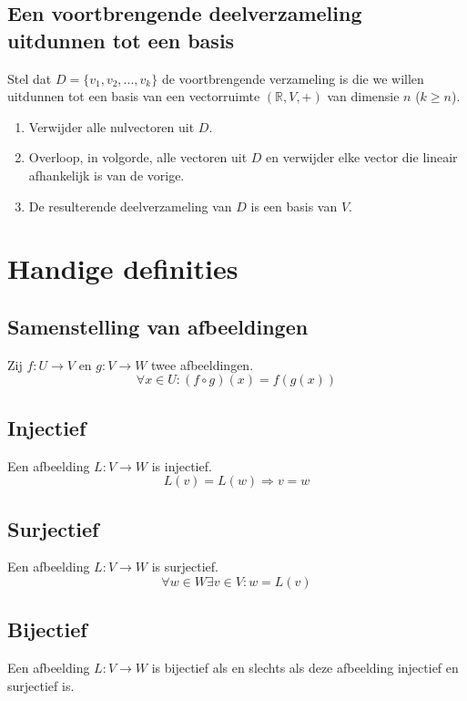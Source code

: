 \documentclass[lineaire_algebra_oplossingen.tex]{subfiles}
\begin{document}
\subsection{Een voortbrengende deelverzameling uitdunnen tot een basis}
Stel dat $D = \{v_1,v_2,...,v_k\}$ de voortbrengende verzameling is die we willen uitdunnen tot een basis van een vectorruimte $(\mathbb{R},V,+)$ van dimensie $n$ ($k\ge n$).
\begin{enumerate}
\item Verwijder alle nulvectoren uit $D$.
\item Overloop, in volgorde, alle vectoren uit $D$ en verwijder elke vector die lineair afhankelijk is van de vorige.
\item De resulterende deelverzameling van $D$ is een basis van $V$.
\end{enumerate}

\section{Handige definities}
\subsection{Samenstelling van afbeeldingen}
\label{samenstelling_van_afbeeldingen}
Zij $f: U \rightarrow V$ en $g: V\rightarrow W$ twee afbeeldingen.
\[
\forall x\in U: (f \circ g)(x) = f(g(x))
\]
\subsection{Injectief}
Een afbeelding $L: V \rightarrow W$ is injectief.
\[
L(v) = L(w) \Rightarrow v = w
\]
\subsection{Surjectief}
Een afbeelding $L: V \rightarrow W$ is surjectief.
\[
\forall w \in W \exists v \in V: w=L(v)
\]
\subsection{Bijectief}
Een afbeelding $L: V \rightarrow W$ is bijectief als en slechts als deze afbeelding injectief en surjectief is.
\end{document}
